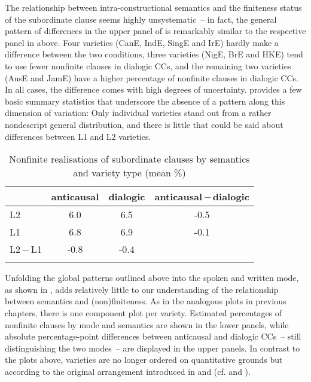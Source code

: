 The relationship between intra-constructional semantics and the finiteness status of the subordinate clause seems highly unsystematic~– in fact, the general pattern of differences in the upper panel of  is remarkably similar to the respective panel in  above. Four varieties (CanE, IndE, SingE and IrE) hardly make a difference between the two conditions, three varieties (NigE, BrE and HKE) tend to use fewer nonfinite clauses in dialogic CCs, and the remaining two varieties (AusE and JamE) have a higher percentage of nonfinite clauses in dialogic CCs. In all cases, the difference comes with high degrees of uncertainty.  provides a few basic summary statistics that underscore the absence of a pattern along this dimension of variation: Only individual varieties stand out from a rather nondescript general distribution, and there is little that could be said about differences between L1 and L2 varieties.\largerpage[-1]

\begin{table}
\caption{\label{bkm:Ref75863153}\label{tab:11.2}Nonfinite realisations of subordinate clauses by semantics and variety type (mean \%)}
\begin{tabular}{l *3{S[table-format=-1.1]}}
\lsptoprule
 & {anticausal} & {dialogic} & {anticausal\,$-$\,dialogic}\\\midrule
L2 & 6.0 & 6.5 & -0.5\\
L1 & 6.8 & 6.9 & -0.1\\
L2\,$-$\,L1 & -0.8 & -0.4 & \\
\lspbottomrule
\end{tabular}
\end{table}

\begin{sloppypar}
Unfolding the global patterns outlined above into the spoken and written mode, as shown in , adds relatively little to our understanding of the relationship between semantics and (non)finiteness. As in the analogous plots in previous chapters, there is one component plot per variety. Estimated percentages of nonfinite clauses by mode and semantics are shown in the lower panels, while absolute percentage-point differences between anticausal and dialogic CCs~– still distinguishing the two modes~– are displayed in the upper panels. In contrast to the plots above, varieties are no longer ordered on quantitative grounds but according to the original arrangement introduced in  and  (cf.  and ).
\end{sloppypar}

